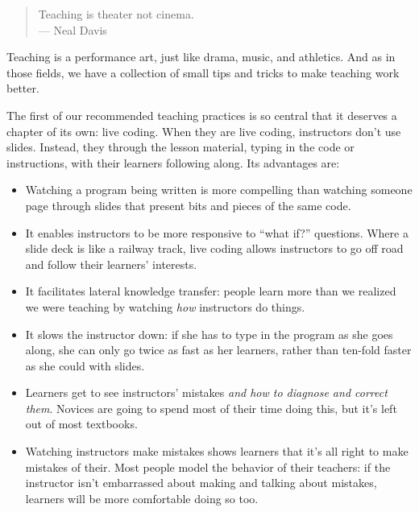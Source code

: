 
\begin{quote}
  Teaching is theater not cinema.
  \\
  --- Neal Davis
\end{quote}

Teaching is a performance art, just like drama, music, and athletics.
And as in those fields, we have a collection of small tips and tricks
to make teaching work better.

The first of our recommended teaching practices is so central that it
deserves a chapter of its own: live coding.  When they are live
coding, instructors don't use slides.  Instead, they through the
lesson material, typing in the code or instructions, with their
learners following along.  Its advantages are:

\begin{itemize}

\item
  Watching a program being written is more compelling than watching
  someone page through slides that present bits and pieces of the same
  code.

\item
  It enables instructors to be more responsive to ``what if?''
  questions. Where a slide deck is like a railway track, live coding
  allows instructors to go off road and follow their learners'
  interests.

\item
  It facilitates lateral knowledge transfer: people learn more than we
  realized we were teaching by watching \emph{how} instructors do
  things.

\item
  It slows the instructor down: if she has to type in the program as
  she goes along, she can only go twice as fast as her learners,
  rather than ten-fold faster as she could with slides.

\item
  Learners get to see instructors' mistakes \emph{and how to diagnose
  and correct them}. Novices are going to spend most of their time
  doing this, but it's left out of most textbooks.

\item
  Watching instructors make mistakes shows learners that it's all
  right to make mistakes of their.  Most people model the behavior of
  their teachers: if the instructor isn't embarrassed about making and
  talking about mistakes, learners will be more comfortable doing so
  too.

\end{itemize}

